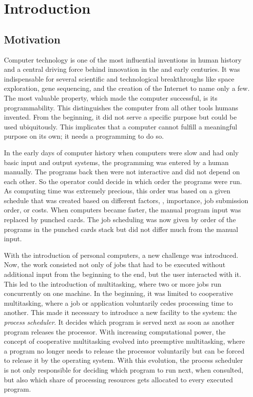 \chapter{Introduction}%
\label{chap:intro}

\section{Motivation}%
\label{sec:intro:motivation}

Computer technology is one of the most influential inventions in human history and a central driving force behind innovation in the  and early  centuries. It was indispensable for several scientific and technological breakthroughs like space exploration, gene sequencing, and the creation of the Internet to name only a few. The most valuable property, which made the computer successful, is its programmability. This distinguishes the computer from all other tools humans invented. From the beginning, it did not serve a specific purpose but could be used ubiquitously. This implicates that a computer cannot fulfill a meaningful purpose on its own; it needs a programming to do so.

In the early days of computer history when computers were slow and had only basic input and output systems, the programming was entered by a human manually. The programs back then were not interactive and did not depend on each other. So the operator could decide in which order the programs were run. As computing time was extremely precious, this order was based on a given schedule that was created based on different factors, \eg, importance, job submission order, or costs. When computers became faster, the manual program input was replaced by punched cards. The job scheduling was now given by order of the programs in the punched cards stack but did not differ much from the manual input.

With the introduction of personal computers, a new challenge was introduced. Now, the work consisted not only of jobs that had to be executed without additional input from the beginning to the end, but the user interacted with it. This led to the introduction of multitasking, where two or more jobs run concurrently on one machine. In the beginning, it was limited to cooperative multitasking, where a job or application voluntarily cedes processing time to another. This made it necessary to introduce a new facility to the system: the \emph{process scheduler}. It decides which program is served next as soon as another program releases the processor. With increasing computational power, the concept of cooperative multitasking evolved into preemptive multitasking, where a program no longer needs to release the processor voluntarily but can be forced to release it by the operating system. With this evolution, the process scheduler is not only responsible for deciding which program to run next, when consulted, but also which share of processing resources gets allocated to every executed program.

